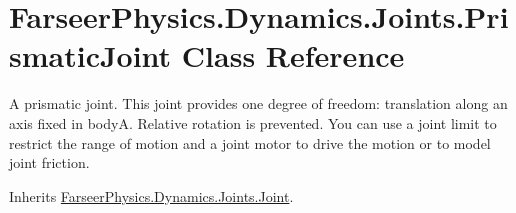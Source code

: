 \hypertarget{class_farseer_physics_1_1_dynamics_1_1_joints_1_1_prismatic_joint}{\section{Farseer\+Physics.\+Dynamics.\+Joints.\+Prismatic\+Joint Class Reference}
\label{class_farseer_physics_1_1_dynamics_1_1_joints_1_1_prismatic_joint}
}


A prismatic joint. This joint provides one degree of freedom\+: translation along an axis fixed in body\+A. Relative rotation is prevented. You can use a joint limit to restrict the range of motion and a joint motor to drive the motion or to model joint friction.  




Inherits \hyperlink{class_farseer_physics_1_1_dynamics_1_1_joints_1_1_joint}{Farseer\+Physics.\+Dynamics.\+Joints.\+Joint}.

